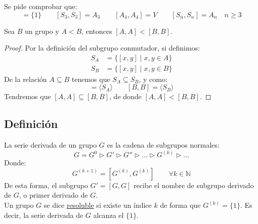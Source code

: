 \begin{ejercicio*}
    Se pide comprobar que:
    \begin{equation*}
        [A_3,A_3] = \{1\} \qquad 
        [S_3,S_3] = A_3 \qquad 
        [A_4, A_4] = V \qquad 
        [S_n, S_n] = A_n \quad n\geq 3
    \end{equation*}
\end{ejercicio*}

\begin{lema}\label{lema:resolubles}
    Sea $B$ un grupo y $A<B$, entonces $[A,A] < [B,B]$.
    \begin{proof}
        Por la definición del subgrupo conmutador, si definimos:
        \begin{align*}
            S_A &= \{[x,y] \mid x,y\in A\} \\
            S_B &= \{[x,y] \mid x,y\in B\} 
        \end{align*}
        De la relación $A\subseteq B$ tenemos que $S_A\subseteq S_B$, y como:
        \begin{equation*}
            [A,A] = \langle S_A \rangle  \qquad [B,B] = \langle S_B \rangle 
        \end{equation*}
        Tendremos que $[A,A]\subseteq [B,B]$, de donde $[A,A] < [B,B]$.
    \end{proof}
\end{lema}

\subsection{Definición}
\begin{definicion}
    La serie derivada de un grupo $G$ es la cadena de subgrupos normales:
    \begin{equation*}
        G = G^0 \rhd G' \rhd G'' \rhd \ldots \rhd G^{(k)} \rhd \ldots
    \end{equation*}
    Donde:
    \begin{equation*}
        G^{(k+1)} = [G^{(k)}, G^{(k)}] \qquad \forall k\in \mathbb{N}
    \end{equation*}
    De esta forma, el subgrupo $G' = [G,G]$ recibe el nombre de subgrupo derivado de $G$, o primer derivado de $G$.\\

    \noindent
    Un grupo $G$ se dice \underline{resoluble} si existe un índice $k$ de forma que $G^{(k)} = \{1\}$. Es decir, la serie derivada de $G$ alcanza el $\{1\}$.
\end{definicion}


